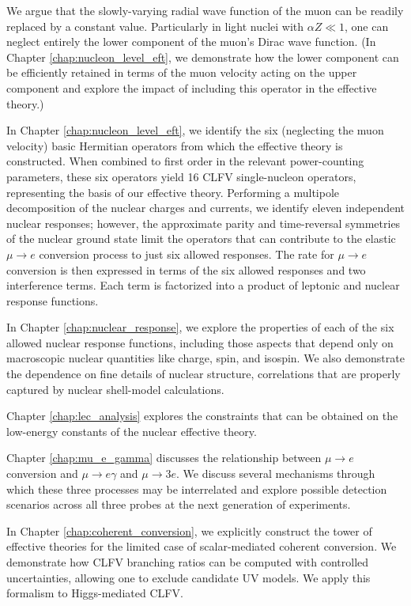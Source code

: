 \documentclass{book}[letterpaper,12pt]
\begin{document}
We argue that the slowly-varying radial wave function of the muon can be readily replaced by a constant value. Particularly in light nuclei with $\alpha Z\ll 1$, one can neglect entirely the lower component of the muon's Dirac wave function. (In Chapter \ref{chap:nucleon_level_eft}, we demonstrate how the lower component can be efficiently retained in terms of the muon velocity acting on the upper component and explore the impact of including this operator in the effective theory.) 

In Chapter \ref{chap:nucleon_level_eft}, we identify the six (neglecting the muon velocity) basic Hermitian operators from which the effective theory is constructed. When combined to first order in the relevant power-counting parameters, these six operators yield 16 CLFV single-nucleon operators, representing the basis of our effective theory. Performing a multipole decomposition of the nuclear charges and currents, we identify eleven independent nuclear responses; however, the approximate parity and time-reversal symmetries of the nuclear ground state limit the operators that can contribute to the elastic $\mu\rightarrow e$ conversion process to just six allowed responses. The rate for $\mu\rightarrow e$ conversion is then expressed in terms of the six allowed responses and two interference terms. Each term is factorized into a product of leptonic and nuclear response functions.

In Chapter \ref{chap:nuclear_response}, we explore the properties of each of the six allowed nuclear response functions, including those aspects that depend only on macroscopic nuclear quantities like charge, spin, and isospin. We also demonstrate the dependence on fine details of nuclear structure, correlations that are properly captured by nuclear shell-model calculations. 

Chapter \ref{chap:lec_analysis} explores the constraints that can be obtained on the low-energy constants of the nuclear effective theory.

Chapter \ref{chap:mu_e_gamma} discusses the relationship between $\mu\rightarrow e$ conversion and $\mu\rightarrow e\gamma$ and $\mu\rightarrow 3e$. We discuss several mechanisms through which these three processes may be interrelated and explore possible detection scenarios across all three probes at the next generation of experiments.

In Chapter \ref{chap:coherent_conversion}, we explicitly construct the tower of effective theories for the limited case of scalar-mediated coherent conversion. We demonstrate how CLFV branching ratios can be computed with controlled uncertainties, allowing one to exclude candidate UV models. We apply this formalism to Higgs-mediated CLFV.
\end{document}
